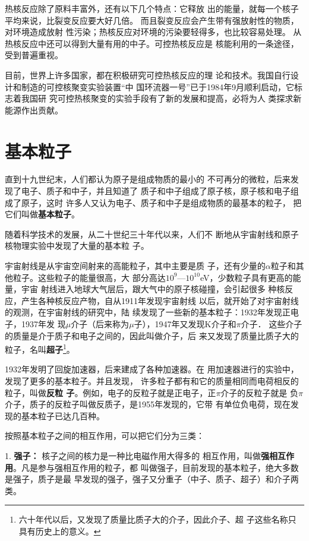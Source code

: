 热核反应除了原料丰富外，还有以下几个特点：它释放
出的能量，就每一个核子平均来说，比裂变反应要大好几倍。
而且裂变反应会产生带有强放射性的物质，对环境造成放射
性污染；热核反应对环境的污染要轻得多，也比较容易处理。
从热核反应中还可以得到大量有用的中子。可控热核反应是
核能利用的一条途径，受到普遍重视。

目前，世界上许多国家，都在积极研究可控热核反应的理
论和技术。我国自行设计和制造的可控核聚变实验装置“中
国环流器一号”已于1984年9月顺利启动，它标志着我国研
究可控热核聚变的实验手段有了新的发展和提高，必将为人
类探求新能源作出贡献。

\section{基本粒子}

直到十九世纪末，人们都认为原子是组成物质的最小的
不可再分的微粒，后来发现了电子、质子和中子，并且知道了
质子和中子组成了原子核，原子核和电子组成了原子，这时
许多人又认为电子、质子和中子是组成物质的最基本的粒子，
把它们叫做\textbf{基本粒子}。

随着科学技术的发展，从二十世纪三十年代以来，人们不
断地从宇宙射线和原子核物理实验中发现了大量的基本粒
子。

宇宙射线是从宇宙空间射来的高能粒子，其中主要是质
子，还有少量的$\alpha$粒子和其他粒子。这些粒子的能量很高，大
部分高达$10^9$—$10^{10}$eV，少数粒子具有更高的能量，宇宙
射线进入地球大气层后，跟大气中的原子核碰撞，会引起很多
种核反应，产生各种核反应产物，自从1911年发现宇宙射线
以后，就开始了对宇宙射线的观测，在宇宙射线的研究中，陆
续发现了一些新的基本粒子：1932年发现正电子，1937年发
现$\mu$介子（后来称为$\mu$子），1947年又发现K介子和$\pi$介子．
这些介子的质量是介于质子和电子之间的，因此叫做介子，后
来又发现了质量比质子大的粒子，名叫\textbf{超子}\footnote{六十年代以后，又发现了质量比质子大的介子，因此介子、超
子这些名称只具有历史上的意义。}。

1932年发明了回旋加速器，后来建成了各种加速器。在
用加速器进行的实验中，发现了更多的基本粒子。并且发现，
许多粒子都有和它的质量相同而电荷相反的粒子，叫做\textbf{反粒
子}。例如，电子的反粒子就是正电子，正$\pi$介子的反粒子就是
负$\pi$介子，质子的反粒子叫做反质子，是1955年发现的，它带
有单位负电荷，现在发现的基本粒子已达几百种。

按照基本粒子之间的相互作用，可以把它们分为三类：

1. \textbf{强子：} 核子之间的核力是一种比电磁作用大得多的
相互作用，叫做\textbf{强相互作用}。凡是参与强相互作用的粒子，都
叫做强子，目前发现的基本粒子，绝大多数是强子，质子是最
早发现的强子，强子又分重子（中子、质子、超子）和介子两类。

